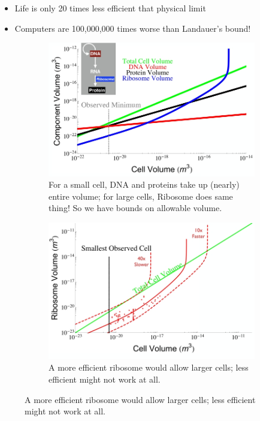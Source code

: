 \documentclass[]{article}
\begin{document}
\begin{itemize}
	\item Life is only 20 times less efficient that physical limit\cite{kempes2017thermodynamic}
	\item Computers are 100,000,000 times worse than Landauer's bound!
\end{itemize}

\begin{figure}[H]
	\caption{Ribosome Tradeoffs}
	\begin{subfigure}[b]{0.45\textwidth}
		\caption{For a small cell, DNA and proteins take up (nearly) entire volume; for large cells, Ribosome does same thing! So we have bounds on allowable volume.\cite{kempes2016evolutionary}}\label{fig:RibosomeTradeoffs} 
		\includegraphics[width=\textwidth]{RibosomeTradeoffs}
	\end{subfigure}
	\;\;\;
	\begin{subfigure}[b]{0.45\textwidth}
		\caption{A more efficient ribosome would allow larger cells; less efficient might not work at all.}\label{fig:RibosomeTradeoffsEarly} 
		\includegraphics[width=\textwidth]{RibosomeTradeoffsEarly}
	\end{subfigure}
\end{figure}
\end{document}
